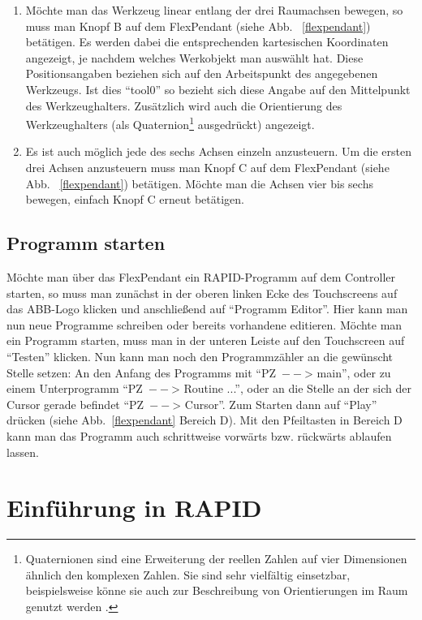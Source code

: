 \begin{enumerate}
\item Möchte man das Werkzeug linear entlang der drei Raumachsen bewegen, so muss man Knopf B auf dem FlexPendant (siehe Abb. ~\ref{flexpendant}) betätigen. Es werden dabei die entsprechenden kartesischen Koordinaten angezeigt, je nachdem welches Werkobjekt man auswählt hat. Diese Positionsangaben beziehen sich auf den Arbeitspunkt des angegebenen Werkzeugs. Ist dies \enquote{tool0} so bezieht sich diese Angabe auf den Mittelpunkt des Werkzeughalters. Zusätzlich wird auch die Orientierung des Werkzeughalters (als Quaternion\footnote{Quaternionen sind eine Erweiterung der reellen Zahlen auf vier Dimensionen ähnlich den komplexen Zahlen. Sie  sind  sehr  vielfältig  einsetzbar, beispielsweise könne sie auch zur Beschreibung von Orientierungen im Raum genutzt werden \cite{quaternion}.} ausgedrückt) angezeigt. 

\item Es ist auch möglich jede des sechs Achsen einzeln anzusteuern. Um die ersten drei Achsen anzusteuern muss man Knopf C auf dem FlexPendant (siehe Abb. ~\ref{flexpendant}) betätigen. Möchte man die Achsen vier bis sechs bewegen, einfach Knopf C erneut betätigen. 
\end{enumerate}

\subsection{Programm starten}

Möchte man über das FlexPendant ein RAPID-Programm auf dem Controller starten, so muss man zunächst in der oberen linken Ecke des Touchscreens auf das ABB-Logo klicken und anschließend auf \enquote{Programm Editor}. Hier kann man nun neue Programme schreiben oder bereits vorhandene editieren. Möchte man ein Programm starten, muss man in der unteren Leiste auf den Touchscreen auf \enquote{Testen} klicken. Nun kann man noch den Programmzähler an die gewünscht Stelle setzen: An den Anfang des Programms mit \enquote{PZ~$--$> main}, oder zu einem Unterprogramm \enquote{PZ~$--$> Routine ...}, oder an die Stelle an der sich der Cursor gerade befindet \enquote{PZ~$--$> Cursor}. Zum Starten dann auf \enquote{Play} drücken (siehe Abb.~\ref{flexpendant} Bereich D). Mit den Pfeiltasten in Bereich D kann man das Programm auch schrittweise vorwärts bzw. rückwärts ablaufen lassen.

\section{Einführung in RAPID}
\label{rapidsection}

